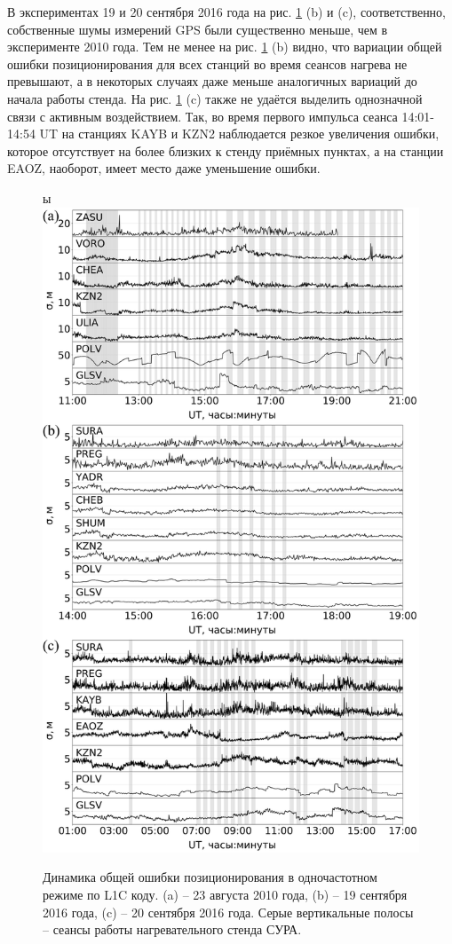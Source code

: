 В экспериментах 19 и 20 сентября 2016 года на рис. \ref{fig-l1c-sura} (b) и (c), соответственно, собственные шумы измерений GPS были существенно меньше, чем в эксперименте 2010 года.
Тем не менее на рис. \ref{fig-l1c-sura} (b) видно, что вариации общей ошибки позиционирования для всех станций во время сеансов нагрева не превышают, а в некоторых случаях даже меньше аналогичных вариаций до начала работы стенда. 
На рис. \ref{fig-l1c-sura} (c) также не удаётся выделить однозначной связи с активным воздействием. 
Так, во время первого импульса сеанса 14:01-14:54 UT на станциях KAYB и KZN2 наблюдается резкое увеличения ошибки, которое отсутствует на более близких к стенду приёмных пунктах, а на станции EAOZ, наоборот, имеет место даже уменьшение ошибки. 
\begin{figure}[h]
\centering    ы
\includegraphics[width=0.75\linewidth]{fig/l1c-sura.png}    
\caption{Динамика общей ошибки позиционирования в одночастотном режиме по L1C коду. (a) -- 23 августа 2010 года, (b) -- 19 сентября 2016 года, (c) -- 20 сентября 2016 года. Серые вертикальные полосы -- сеансы работы нагревательного стенда СУРА.}
\label{fig-l1c-sura}      
\end{figure} 
\clearpage